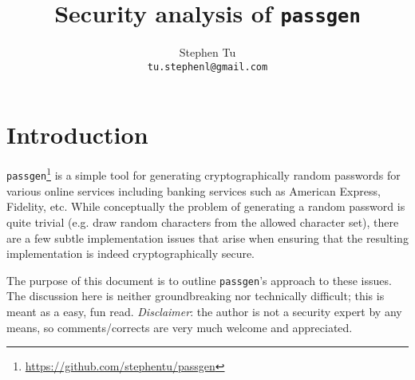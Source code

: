 \documentclass[10pt]{article}
\title{Security analysis of \texttt{passgen}}
\date{}
\author{Stephen Tu \\ \texttt{tu.stephenl@gmail.com}}
\begin{document}
\maketitle

\section{Introduction}
\texttt{passgen}\footnote{\url{https://github.com/stephentu/passgen}} is a
simple tool for generating cryptographically random passwords for various
online services including banking services such as American Express, Fidelity,
etc. While conceptually the problem of generating a random password is quite
trivial (e.g. draw random characters from the allowed character set), there are
a few subtle implementation issues that arise when ensuring that the resulting
implementation is indeed cryptographically secure.

The purpose of this document is to outline \texttt{passgen}'s approach to these
issues. The discussion here is neither groundbreaking nor technically
difficult; this is meant as a easy, fun read. \textit{Disclaimer}: the author is
not a security expert by any means, so comments/corrects are very much welcome
and appreciated.
\end{document}
